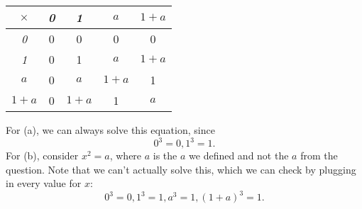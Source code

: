 \documentclass{assignment}
\begin{document}
\begin{qparts}
\begin{center}
    \begin{tabular}{c|c|c|c|c}
      $\times$ & \emph{0} & \emph{1} & \emph{$a$} & \emph{$1+a$} \\
      \hline 
      \emph{0} & 0 & 0 & 0 & 0 \\
      \emph{1} & 0 & 1 & $a$ & $1+a$ \\
      \emph{$a$} & 0 & $a$ & $1+a$ & 1 \\
      \emph{$1+a$} & 0 & $1+a$ & 1 & $a$ 
    \end{tabular}
  \end{center}

\item 
    For (a), we can always solve this equation, since $$0^3 = 0, 1^3 = 1.$$ 
    For (b), consider $x^2 = a$, where $a$ is the $a$ we defined and not the $a$ from the question. Note that
    we can't actually solve this, which we can check by plugging in every value for $x$: $$0^3 = 0,
    1^3 = 1, a^3 = 1, (1+a)^3 = 1.$$
\end{qparts}

\question[Rudin, 1.3]{
}
\end{document}
